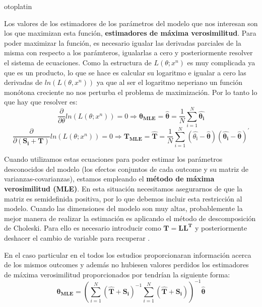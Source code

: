 otoplatin\documentclass[a4paper,openright,12pt]{report}
\begin{document}
Los valores de los estimadores de los parámetros del modelo que nos interesan son los que maximizan esta función, \textbf{estimadores de máxima verosimilitud}. Para poder maximizar la función, es necesario igualar las derivadas parciales de la misma con respecto a los parámteros, igualarlas a cero y posteriormente resolver el sistema de ecuaciones. Como la estructura de $L(\theta;x^{n})$ es muy complicada ya que es un producto, lo que se hace es calcular su logaritmo e igualar a cero las derivadas de $ln(L(\theta,x^{n}))$ ya que al ser el logaritmo neperiano un función monótona creciente no nos perturba el problema de maximización. Por lo tanto lo que hay que resolver es: 
\begin{equation}
\frac{\partial}{\partial\mathbb{\theta}}ln(L(\theta;x^{n}))=0 \Rightarrow \mathbf{\theta_{MLE}}=\mathbf{\widehat{\theta}}=\frac{1}{N}\sum_{i=1}^{N}\mathbf{\widehat{\theta_{i}}}
\label{der_respecto_mu}
\end{equation}
\begin{equation}
\frac{\partial}{\partial\mathbf{(S_{i}+T)}}ln(L(\theta;x^{n}))=0 \Rightarrow \mathbf{T_{MLE}}=\mathbf{\widehat{T}}=\frac{1}{N}\sum_{i=1}^{N}(\mathbb{\widehat{\theta_{i}}}-\mathbf{\widehat{\theta}})(\mathbf{\widehat{\theta_{i}}}-\mathbf{\widehat{\theta}})^{'}
\label{der_respecto_sigma}
\end{equation}

Cuando utilizamos estas ecuaciones para poder estimar los parámetros desconocidos del modelo (los efectos conjuntos de cada outcome y su matriz de varianzas-covarianzas), estamos empleando el \textbf{método de máxima verosimilitud (MLE)}. En esta situación necesitamos asegurarnos de que la matriz  es semidefinida positiva, por lo que debemos incluir esta restricción al modelo. Cuando las dimensiones del modelo son muy altas, probablemente la mejor manera de realizar la estimación es aplicando el método de descomposición de Choleski. Para ello es necesario introducir  como $\mathbf{T}=\mathbf{L}\mathbf{L^{T}}$ y posteriormente deshacer el cambio de variable para recuperar  \cite{Jackson2011}.

En el caso particular en el todos los estudios proporcionaran información acerca de los mismos outcomes y además no hubiesen valores perdidos los estimadores de máxima verosimilitud proporcionados por \cite{Mavridis2011} tendrían la siguiente forma:
\begin{equation}
\mathbf{\theta_{MLE}}=(\sum_{i=1}^{N}(\mathbf{\widehat{T}+S_{i}})^{-1}\sum_{i=1}^{N}(\mathbf{\widehat{T}+S_{i}}))^{-1}\mathbf{\widehat{\theta}}
\label{mle_theta_mavridis}
\end{equation}
\end{document}
